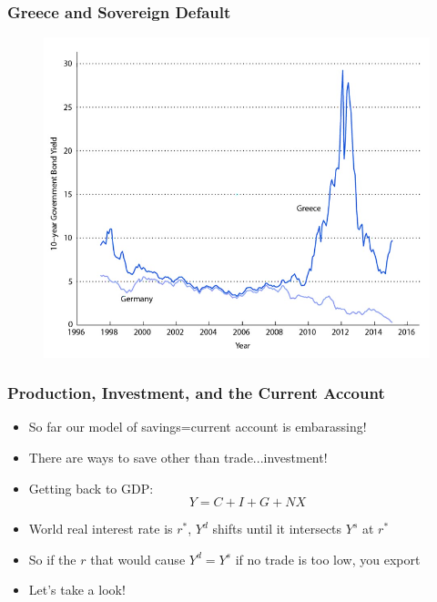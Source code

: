 \documentclass{beamer}
\begin{document}
\begin{frame}
\frametitle[alignment=center]{Greece and Sovereign Default}
\begin{figure}
\centering
\includegraphics[scale=0.7]{Figures/W_Fig_16pt5.png}
\end{figure}
\end{frame}

\begin{frame}
\frametitle[alignment=center]{Production, Investment, and the Current Account}
\begin{itemize}
\item So far our model of savings=current account is embarassing!
\bigskip
\item There are ways to save other than trade...investment!
\bigskip
\item Getting back to GDP:
$$Y=C+I+G+NX$$
\item World real interest rate is $r^*$, $Y^d$ shifts until it intersects $Y^s$ at $r^*$
\bigskip
\item So if the $r$ that would cause $Y^d=Y^s$ if no trade is too low, you export
\bigskip
\item Let's take a look!
\end{itemize}
\end{frame}
\end{document}
